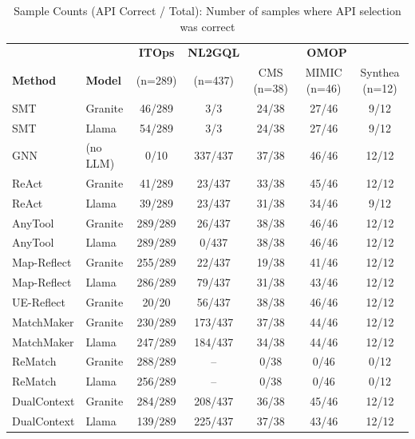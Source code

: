 \documentclass[sigconf, nonacm]{acmart}
\begin{document}
  \begin{table}[htbp]
  \centering
  \caption{Sample Counts (API Correct / Total): Number of samples where API selection was correct}
  \label{tab:sample_counts}
  \begin{tabular}{ll|c|c|ccc}
  \toprule
  & & \textbf{ITOps} & \textbf{NL2GQL} & \multicolumn{3}{c}{\textbf{OMOP}} \\
  \textbf{Method} & \textbf{Model} & (n=289) & (n=437) & CMS (n=38) & MIMIC (n=46) & Synthea (n=12) \\
  \midrule
  SMT & Granite & 46/289 & 3/3 & 24/38 & 27/46 & 9/12 \\
  SMT & Llama & 54/289 & 3/3 & 24/38 & 27/46 & 9/12 \\
  \midrule
  GNN & (no LLM) & 0/10 & 337/437 & 37/38 & 46/46 & 12/12 \\
  \midrule
  ReAct & Granite & 41/289 & 23/437 & 33/38 & 45/46 & 12/12 \\
  ReAct & Llama & 39/289 & 23/437 & 31/38 & 34/46 & 9/12 \\
  \midrule
  AnyTool & Granite & 289/289 & 26/437 & 38/38 & 46/46 & 12/12 \\
  AnyTool & Llama & 289/289 & 0/437 & 38/38 & 46/46 & 12/12 \\
  \midrule
  Map-Reflect & Granite & 255/289 & 22/437 & 19/38 & 41/46 & 12/12 \\
  Map-Reflect & Llama & 286/289 & 79/437 & 31/38 & 43/46 & 12/12 \\
  \midrule
  UE-Reflect & Granite & 20/20 & 56/437 & 38/38 & 46/46 & 12/12 \\
  \midrule
  MatchMaker & Granite & 230/289 & 173/437 & 37/38 & 44/46 & 12/12 \\
  MatchMaker & Llama & 247/289 & 184/437 & 34/38 & 44/46 & 12/12 \\
  \midrule
  ReMatch & Granite & 288/289 & -- & 0/38 & 0/46 & 0/12 \\
  ReMatch & Llama & 256/289 & -- & 0/38 & 0/46 & 0/12 \\
  \midrule
  DualContext & Granite & 284/289 & 208/437 & 36/38 & 45/46 & 12/12 \\
  DualContext & Llama & 139/289 & 225/437 & 37/38 & 43/46 & 12/12 \\
  \bottomrule
  \end{tabular}
  \end{table}
\end{document}

